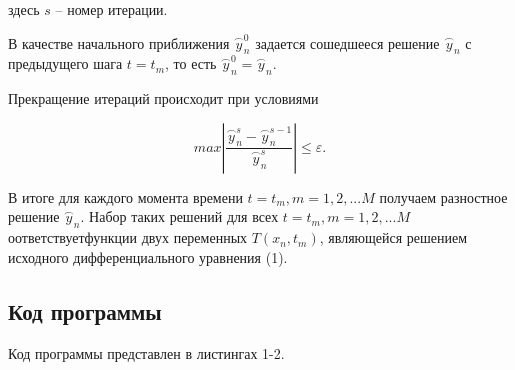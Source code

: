 \documentclass[a4paper,14pt]{article}
\begin{document}
здесь $s$ -- номер итерации.

В  качестве  начального  приближения $\stackrel{\frown}{y}_n^0$ задается  сошедшееся  решение 
$\stackrel{\frown}{y}_n$ с предыдущего шага $t = t_m$, то есть $\stackrel{\frown}{y}_n^0 = \stackrel{\frown}{y}_n$.

Прекращение итераций происходит при условиями

\begin{equation}
	max \left| \frac{\stackrel{\frown}{y}_n^s - \stackrel{\frown}{y}_n^{s-1}}{\stackrel{\frown}{y}_n^s} \right| \leq \varepsilon.
\end{equation}

В  итоге  для  каждого  момента  времени $t = t_m, m = 1, 2, ... M$ получаем  разностное решение
$\stackrel{\frown}{y}_n$. Набор таких решений для всех $t = t_m, m = 1, 2, ... M$ оответствуетфункции двух переменных 
$T(x_n, t_m)$, являющейся решением исходного  дифференциального  уравнения (1).

\subsection*{Код программы}

Код программы представлен в листингах 1-2.
\end{document}

